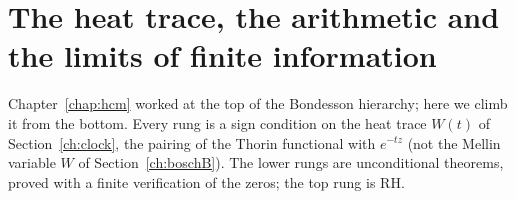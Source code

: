 \chapter{The heat trace, the arithmetic and the limits of finite information}\label{chap:heat}

Chapter~\ref{chap:hcm} worked at the top of the Bondesson hierarchy; here we climb it from the bottom. Every rung is a sign condition on the heat trace $W(t)$ of Section~\ref{ch:clock}, the pairing of the Thorin functional with $e^{-tz}$ (not the Mellin variable $W$ of Section~\ref{ch:boschB}). The lower rungs are unconditional theorems, proved with a finite verification of the zeros; the top rung is RH.

